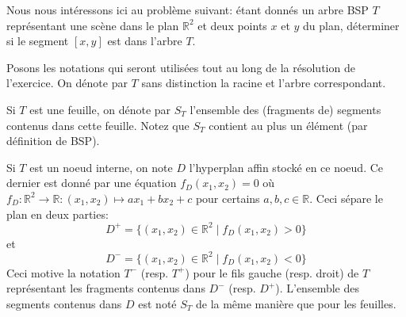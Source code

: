 
Nous nous intéressons ici au problème suivant: étant donnés
un arbre BSP $T$ représentant une scène dans le plan $\mathbb{R}^2$
et deux points $x$ et $y$ du plan, déterminer si le segment $[x, y]$
est dans l'arbre $T$.

Posons les notations qui seront utilisées tout au long de la
résolution de l'exercice. On dénote par $T$ sans distinction la
racine et l'arbre correspondant.

Si $T$ est une feuille, on dénote par $S_T$ l'ensemble des
(fragments de) segments contenus dans cette feuille.
Notez que $S_T$ contient au plus un élément (par définition de BSP).

Si $T$ est un noeud interne, on note $D$ l'hyperplan affin stocké
en ce noeud. Ce dernier est donné par une équation $f_D(x_1, x_2) = 0$
où $f_D: \mathbb{R}^2 \to \mathbb{R}: (x_1, x_2)\mapsto a x_1 + b x_2 +c$
pour certains $a, b, c\in\mathbb{R}$. Ceci sépare le plan en deux
parties: $$D^+=\{(x_1, x_2)\in\mathbb{R}^2\mid f_D(x_1, x_2) > 0\}$$ et
$$D^-=\{(x_1, x_2)\in\mathbb{R}^2\mid f_D(x_1, x_2) < 0\}$$
Ceci motive la notation $T^-$ (resp. $T^+$) pour le fils gauche
(resp. droit) de $T$ représentant les fragments contenus dans $D^-$
(resp. $D^+$). L'ensemble des segments contenus dans $D$ est noté
$S_T$ de la même manière que pour les feuilles.
